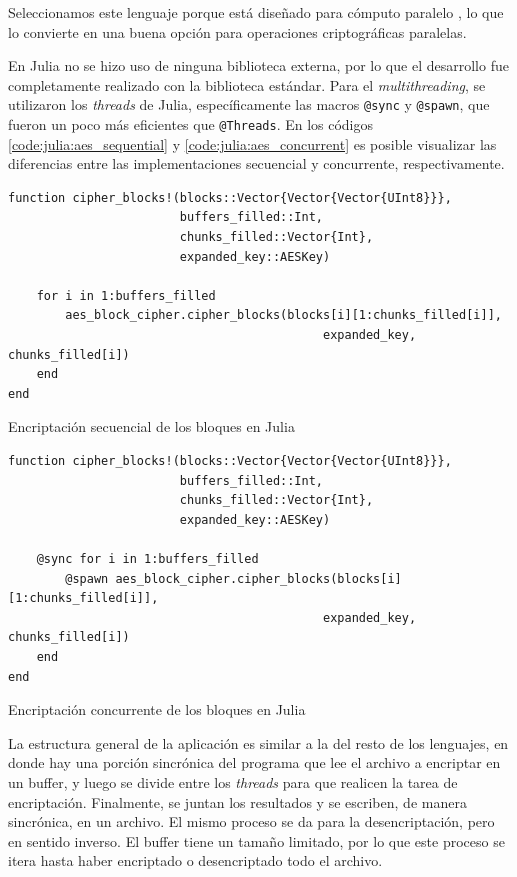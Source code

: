 \documentclass[11pt]{article}
\begin{document}
Seleccionamos este lenguaje porque está diseñado para cómputo paralelo \cite{jl:ex:parallelism}, lo que lo convierte en una buena opción para operaciones criptográficas paralelas.

En Julia no se hizo uso de ninguna biblioteca externa, por lo que el desarrollo fue completamente realizado con la biblioteca estándar. Para el \textit{multithreading}, se utilizaron los \textit{threads} de Julia, específicamente las macros \lstinline{@sync} y \lstinline{@spawn}, que fueron un poco más eficientes que \lstinline{@Threads}. En los códigos \ref{code:julia:aes_sequential} y \ref{code:julia:aes_concurrent} es posible visualizar las diferencias entre las implementaciones secuencial y concurrente, respectivamente.

\begin{listing}[h]
\begin{verbatim}
function cipher_blocks!(blocks::Vector{Vector{Vector{UInt8}}},
                        buffers_filled::Int,
                        chunks_filled::Vector{Int},
                        expanded_key::AESKey)

    for i in 1:buffers_filled
        aes_block_cipher.cipher_blocks(blocks[i][1:chunks_filled[i]],
                                            expanded_key, chunks_filled[i])
    end
end
\end{verbatim}
\caption{Encriptación secuencial de los bloques en Julia}
\label{code:julia:aes_sequential}
\end{listing}

\begin{listing}[h]
\begin{verbatim}
function cipher_blocks!(blocks::Vector{Vector{Vector{UInt8}}},
                        buffers_filled::Int,
                        chunks_filled::Vector{Int},
                        expanded_key::AESKey)

    @sync for i in 1:buffers_filled
        @spawn aes_block_cipher.cipher_blocks(blocks[i][1:chunks_filled[i]],
                                            expanded_key, chunks_filled[i])
    end
end
\end{verbatim}
\caption{Encriptación concurrente de los bloques en Julia}
\label{code:julia:aes_concurrent}
\end{listing}

La estructura general de la aplicación es similar a la del resto de los lenguajes, en donde hay una porción sincrónica del programa que lee el archivo a encriptar en un buffer, y luego se divide entre los \textit{threads} para que realicen la tarea de encriptación. Finalmente, se juntan los resultados y se escriben, de manera sincrónica, en un archivo. El mismo proceso se da para la desencriptación, pero en sentido inverso. El buffer tiene un tamaño limitado, por lo que este proceso se itera hasta haber encriptado o desencriptado todo el archivo.
\end{document}
